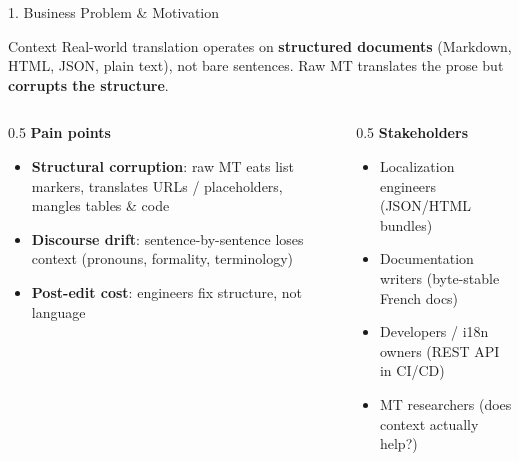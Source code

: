 \documentclass[10pt,aspectratio=169]{beamer}
\begin{document}
\begin{frame}{1. Business Problem \& Motivation}
\begin{block}{Context}
Real-world translation operates on \textbf{structured documents} (Markdown, HTML, JSON, plain text), not bare sentences. Raw MT translates the prose but \textbf{corrupts the structure}.
\end{block}

\begin{columns}[T]
\begin{column}{0.5\textwidth}
\textbf{Pain points}
\begin{itemize}
  \item \textbf{Structural corruption}: raw MT eats list markers, translates URLs / placeholders, mangles tables \& code
  \item \textbf{Discourse drift}: sentence-by-sentence loses context (pronouns, formality, terminology)
  \item \textbf{Post-edit cost}: engineers fix structure, not language
\end{itemize}
\end{column}
\begin{column}{0.5\textwidth}
\textbf{Stakeholders}
\begin{itemize}
  \item Localization engineers (JSON/HTML bundles)
  \item Documentation writers (byte-stable French docs)
  \item Developers / i18n owners (REST API in CI/CD)
  \item MT researchers (does context actually help?)
\end{itemize}
\end{column}
\end{columns}
\end{frame}
\end{document}
